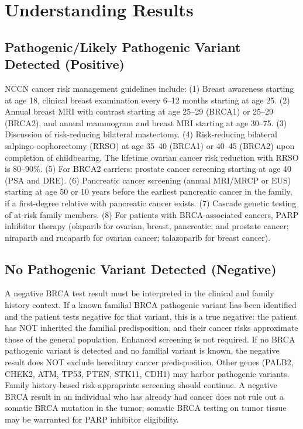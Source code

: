 \section*{Understanding Results}

\subsection*{Pathogenic/Likely Pathogenic Variant Detected (Positive)}
NCCN cancer risk management guidelines include: (1) Breast awareness starting at age 18, clinical breast examination every 6--12 months starting at age 25. (2) Annual breast MRI with contrast starting at age 25--29 (BRCA1) or 25--29 (BRCA2), and annual mammogram and breast MRI starting at age 30--75. (3) Discussion of risk-reducing bilateral mastectomy. (4) Risk-reducing bilateral salpingo-oophorectomy (RRSO) at age 35--40 (BRCA1) or 40--45 (BRCA2) upon completion of childbearing. The lifetime ovarian cancer risk reduction with RRSO is 80--90\%. (5) For BRCA2 carriers: prostate cancer screening starting at age 40 (PSA and DRE). (6) Pancreatic cancer screening (annual MRI/MRCP or EUS) starting at age 50 or 10 years before the earliest pancreatic cancer in the family, if a first-degree relative with pancreatic cancer exists. (7) Cascade genetic testing of at-risk family members. (8) For patients with BRCA-associated cancers, PARP inhibitor therapy (olaparib for ovarian, breast, pancreatic, and prostate cancer; niraparib and rucaparib for ovarian cancer; talazoparib for breast cancer).

\subsection*{No Pathogenic Variant Detected (Negative)}
A negative BRCA test result must be interpreted in the clinical and family history context. If a known familial BRCA pathogenic variant has been identified and the patient tests negative for that variant, this is a true negative: the patient has NOT inherited the familial predisposition, and their cancer risks approximate those of the general population. Enhanced screening is not required. If no BRCA pathogenic variant is detected and no familial variant is known, the negative result does NOT exclude hereditary cancer predisposition. Other genes (PALB2, CHEK2, ATM, TP53, PTEN, STK11, CDH1) may harbor pathogenic variants. Family history-based risk-appropriate screening should continue. A negative BRCA result in an individual who has already had cancer does not rule out a somatic BRCA mutation in the tumor; somatic BRCA testing on tumor tissue may be warranted for PARP inhibitor eligibility.

